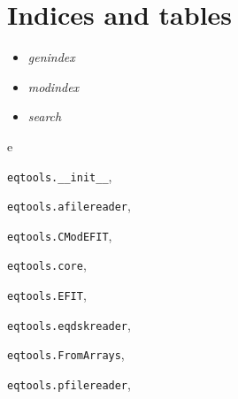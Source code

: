 \documentclass[letterpaper,10pt,english]{sphinxmanual}
\begin{document}
\chapter{Indices and tables}
\label{index:indices-and-tables}\begin{itemize}
\item {} 
\emph{genindex}

\item {} 
\emph{modindex}

\item {} 
\emph{search}

\end{itemize}


\renewcommand{\indexname}{Python Module Index}
\begin{theindex}
\def\bigletter#1{{\Large\sffamily#1}\nopagebreak\vspace{1mm}}
\bigletter{e}
\item {\texttt{eqtools.\_\_init\_\_}}, \pageref{eqtools:module-eqtools.__init__}
\item {\texttt{eqtools.afilereader}}, \pageref{eqtools:module-eqtools.afilereader}
\item {\texttt{eqtools.CModEFIT}}, \pageref{eqtools:module-eqtools.CModEFIT}
\item {\texttt{eqtools.core}}, \pageref{eqtools:module-eqtools.core}
\item {\texttt{eqtools.EFIT}}, \pageref{eqtools:module-eqtools.EFIT}
\item {\texttt{eqtools.eqdskreader}}, \pageref{eqtools:module-eqtools.eqdskreader}
\item {\texttt{eqtools.FromArrays}}, \pageref{eqtools:module-eqtools.FromArrays}
\item {\texttt{eqtools.pfilereader}}, \pageref{eqtools:module-eqtools.pfilereader}
\end{theindex}

\renewcommand{\indexname}{Index}
\printindex
\end{document}
